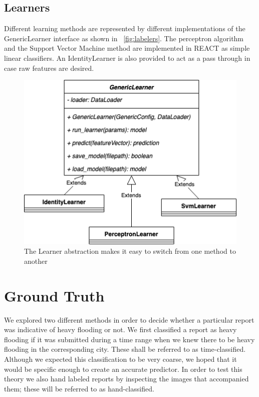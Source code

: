 \subsection{Learners}
Different learning methods are represented by different implementations of
the GenericLearner interface as shown in \figureautorefname{}~\ref{fig:labelers}. The perceptron algorithm and the Support Vector
Machine method are implemented in REACT as simple linear classifiers. An 
IdentityLearner is also provided to act as a pass through in case raw 
features are desired.
\begin{figure}[ht]
    \centering
    \includegraphics[scale=0.6]{images/learners.png}
    \caption{The Learner abstraction makes it easy to switch from one method to another}
    \label{fig:learners}
\end{figure}

\section{Ground Truth}
We explored two different methods in order to decide whether a particular report
was indicative of heavy flooding or not. We first classified a report as heavy
flooding if it was submitted during a time range when we knew there to be heavy 
flooding in the corresponding city. These shall be referred to as time-classified.
Although we expected this classification to be very coarse, we hoped that it would
be specific enough to create an accurate predictor. In order to test this theory 
we also hand labeled reports by inspecting the images that accompanied them; these
will be referred to as hand-classified. 

